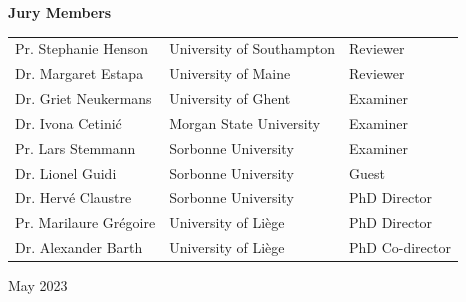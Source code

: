 \documentclass[a4paper]{report}
\begin{document}
\begin{titlepage}
\begin{center}
        \begin{flushleft}
            \large
            \textbf{Jury Members}\\
            \vspace{0.1cm}
            \begin{tabular}{lll}
                Pr. Stephanie Henson & University of Southampton & Reviewer\\
                Dr. Margaret Estapa & University of Maine & Reviewer \\
                Dr. Griet Neukermans & University of Ghent & Examiner \\
                Dr. Ivona Cetini\'{c} & Morgan State University & Examiner\\
                Pr. Lars Stemmann & Sorbonne University & Examiner\\
                Dr. Lionel Guidi & Sorbonne University & Guest\\
                Dr. Hervé Claustre & Sorbonne University & PhD Director\\
                Pr. Marilaure Grégoire & University of Liège & PhD Director\\
                Dr. Alexander Barth & University of Liège & PhD Co-director\\
            \end{tabular}
        \end{flushleft}
        
        \vspace{1cm}
        {\large May 2023} %
   
    \end{center}
\end{titlepage}

\newpage
\thispagestyle{empty}
\null
\end{document}
